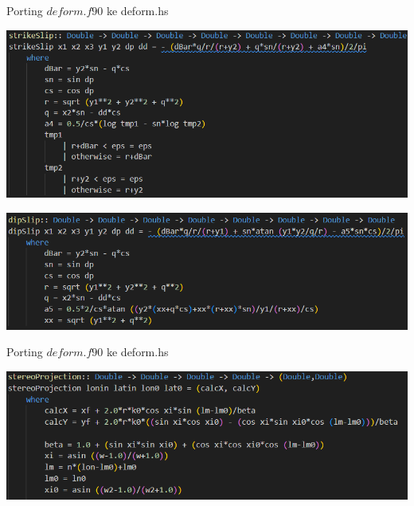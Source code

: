 \documentclass{beamer}
\begin{document}
\begin{frame}{Porting $deform.f90$ ke deform.hs}
    \begin{center}
        \includegraphics[scale=0.4]{figure/deform2.png}
    \end{center}
    \begin{center}
        \includegraphics[scale=0.4]{figure/deform3.png}
    \end{center}
\end{frame}

\begin{frame}{Porting $deform.f90$ ke deform.hs}
    \begin{center}
        \includegraphics[scale=0.4]{figure/deform4.png}
    \end{center}
\end{frame}
\end{document}
